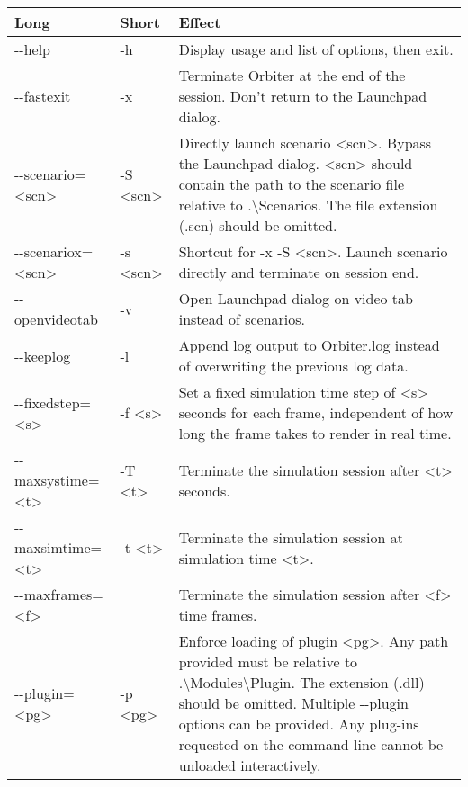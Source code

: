 \documentclass[Orbiter User Manual.tex]{subfiles}
\begin{document}
	\begin{longtable}{ |p{}|p{}|p{}| }
	\hline\rule{0pt}{2ex}
	\textbf{Long} & \textbf{Short} & \textbf{Effect}\\
	\hline\rule{0pt}{2ex}
	-{}-help & -h & Display usage and list of options, then exit.\\
	\hline\rule{0pt}{2ex}
	-{}-fastexit & -x & Terminate Orbiter at the end of the session. Don't return to the Launchpad dialog.\\
	\hline\rule{0pt}{2ex}
	-{}-scenario=<scn> & -S <scn> & Directly launch scenario <scn>. Bypass the Launchpad dialog. <scn> should contain the path to the scenario file relative to .\textbackslash Scenarios. The file extension (.scn) should be omitted.\\
	\hline\rule{0pt}{2ex}
	-{}-scenariox=<scn> & -s <scn> & Shortcut for -x -S <scn>. Launch scenario directly and terminate on session end.\\
	\hline\rule{0pt}{2ex}
	-{}-openvideotab & -v & Open Launchpad dialog on video tab instead of scenarios.\\
	\hline\rule{0pt}{2ex}
	-{}-keeplog & -l & Append log output to Orbiter.log instead of overwriting the previous log data.\\
	\hline\rule{0pt}{2ex}
	-{}-fixedstep=<s> & -f <s> & Set a fixed simulation time step of <s> seconds for each frame, independent of how long the frame takes to render in real time.\\
	\hline\rule{0pt}{2ex}
	-{}-maxsystime=<t> & -T <t> & Terminate the simulation session after <t> seconds.\\
	\hline\rule{0pt}{2ex}
	-{}-maxsimtime=<t> & -t <t> & Terminate the simulation session at simulation time <t>.\\
	\hline\rule{0pt}{2ex}
	-{}-maxframes=<f> & & Terminate the simulation session after <f> time frames.\\
	\hline\rule{0pt}{2ex}
	-{}-plugin=<pg> & -p <pg> & Enforce loading of plugin <pg>. Any path provided must be relative to .\textbackslash Modules\textbackslash Plugin. The extension (.dll) should be omitted. Multiple -{}-plugin options can be provided. Any plug-ins requested on the command line cannot be unloaded interactively.\\
	\hline
	\end{longtable}
\end{document}
